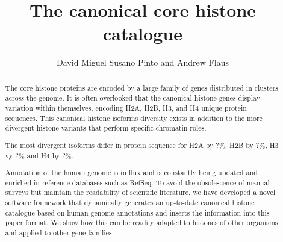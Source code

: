 \documentclass[10pt,a4paper,onecolumn,article]{memoir}
\author{David Miguel Susano Pinto and Andrew Flaus}
\title{The canonical core histone catalogue}
\begin{document}

  \maketitle

  \begin{abstract}
    The core histone proteins are encoded by a large family of genes distributed in clusters across the
    genome. It is often overlooked that the canonical histone genes display variation within
    themselves, encoding \HTwoAUniqueProteins{} H2A, \HTwoBUniqueProteins{} H2B,
    \HThreeUniqueProteins{} H3, and \HFourUniqueProteins{} H4
    unique protein sequences. This canonical histone isoforms diversity exists
    in addition to the more divergent histone variants that perform specific chromatin roles.

    The most divergent isoforms differ in protein sequence for H2A by ?\%, H2B by ?\%, H3 vy ?\% and H4
    by ?\%. 

    Annotation of the human genome is in flux and is constantly being updated and enriched in reference
    databases such as RefSeq. To avoid the obsolescence of manual surveys but maintain the readability
    of scientific literature, we have developed a novel software framework that dynamically generates
    an up-to-date canonical histone catalogue based on human genome annotations and inserts the
    information into this paper format. We show how this can be readily adapted to histones of other
    organisms and applied to other gene families.
  \end{abstract}

  
  
  
  

\end{document}
